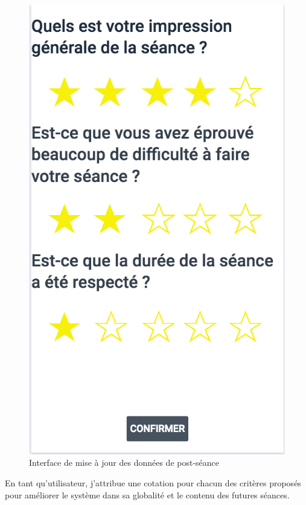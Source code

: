 \begin{figure}[!h]
\centering
\includegraphics[scale=0.3]{ihms/rating_before_update}
\caption{Interface de mise à jour des données de post-séance}
\end{figure} 

\begin{itshape}
En tant qu'utilisateur, j'attribue une cotation pour chacun des critères proposés pour améliorer le système dans sa globalité et le contenu des futures séances.
\end{itshape}

